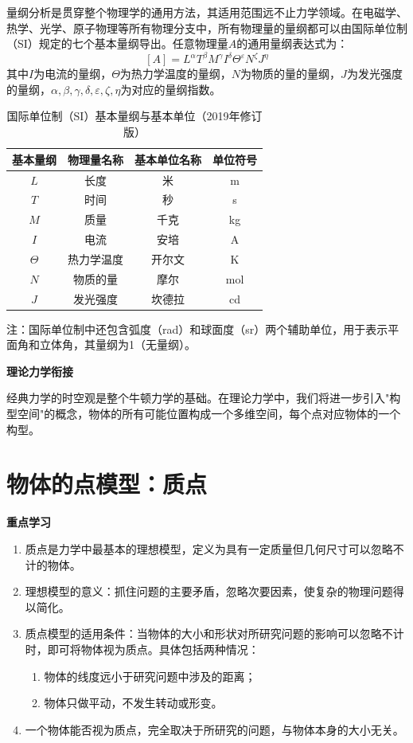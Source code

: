 量纲分析是贯穿整个物理学的通用方法，其适用范围远不止力学领域。在电磁学、热学、光学、原子物理等所有物理分支中，所有物理量的量纲都可以由国际单位制（SI）规定的七个基本量纲导出。任意物理量$A$的通用量纲表达式为：
\[
[A] = L^\alpha T^\beta M^\gamma I^\delta \Theta^\varepsilon N^\zeta J^\eta
\]
其中$I$为电流的量纲，$\Theta$为热力学温度的量纲，$N$为物质的量的量纲，$J$为发光强度的量纲，$\alpha,\beta,\gamma,\delta,\varepsilon,\zeta,\eta$为对应的量纲指数。

\begin{table}[htbp]
  \centering
  \caption{国际单位制（SI）基本量纲与基本单位（2019年修订版）}
  \begin{tabular}{cccc}
    \toprule
    基本量纲 & 物理量名称 & 基本单位名称 & 单位符号 \\
    \midrule
    $L$ & 长度 & 米 & m \\
    $T$ & 时间 & 秒 & s \\
    $M$ & 质量 & 千克 & kg \\
    $I$ & 电流 & 安培 & A \\
    $\Theta$ & 热力学温度 & 开尔文 & K \\
    $N$ & 物质的量 & 摩尔 & mol \\
    $J$ & 发光强度 & 坎德拉 & cd \\
    \bottomrule
  \end{tabular}
  \label{tab:si_basic_units}
\end{table}

注：国际单位制中还包含弧度（rad）和球面度（sr）两个辅助单位，用于表示平面角和立体角，其量纲为1（无量纲）。

\textbf{理论力学衔接}

经典力学的时空观是整个牛顿力学的基础。在理论力学中，我们将进一步引入"构型空间"的概念，物体的所有可能位置构成一个多维空间，每个点对应物体的一个构型。

\newpage

\section{物体的点模型：质点}
\textbf{重点学习}
\begin{enumerate}[label=\arabic*.]
\item 质点是力学中最基本的理想模型，定义为具有一定质量但几何尺寸可以忽略不计的物体。
\item 理想模型的意义：抓住问题的主要矛盾，忽略次要因素，使复杂的物理问题得以简化。
\item 质点模型的适用条件：当物体的大小和形状对所研究问题的影响可以忽略不计时，即可将物体视为质点。具体包括两种情况：
    \begin{enumerate}[label=(\alph*)]
    \item 物体的线度远小于研究问题中涉及的距离；
    \item 物体只做平动，不发生转动或形变。
    \end{enumerate}
\item 一个物体能否视为质点，完全取决于所研究的问题，与物体本身的大小无关。
\end{enumerate}

